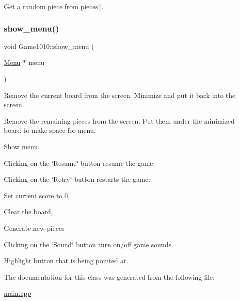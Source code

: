 Get a random piece from pieces\mbox{[}\mbox{]}. 

\mbox{\label{class_game1010_a99d6f53c3073861fe37ef67caa073840}} 
\subsubsection{\texorpdfstring{show\+\_\+menu()}{show\_menu()}}
{\footnotesize\ttfamily void Game1010\+::show\+\_\+menu (\begin{DoxyParamCaption}\item[{\mbox{\hyperlink{class_menu}{Menu}} $\ast$}]{menu }\end{DoxyParamCaption})\hspace{0.3cm}{\ttfamily [inline]}}

Remove the current board from the screen. Minimize and put it back into the screen.

Remove the remaining pieces from the screen. Put them under the minimized board to make space for menu.

Show menu.

Clicking on the \char`\"{}\+Resume\char`\"{} button resume the game\+:

Clicking on the \char`\"{}\+Retry\char`\"{} button restarts the game\+:

Set current score to 0,

Clear the board,

Generate new pieces

Clicking on the \char`\"{}\+Sound\char`\"{} button turn on/off game sounds.

Highlight button that is being pointed at.

The documentation for this class was generated from the following file\+:\begin{DoxyCompactItemize}
\item 
\mbox{\hyperlink{main_8cpp}{main.\+cpp}}\end{DoxyCompactItemize}
